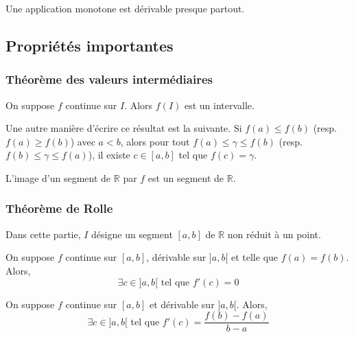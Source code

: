 	\begin{theorem}[Lebesgue]
		Une application monotone est dérivable presque partout.
	\end{theorem}

	\newpage
	\subsection{Propriétés importantes}

	\subsubsection{Théorème des valeurs intermédiaires}


	\begin{theorem}
		On suppose $f$ continue sur $I$. Alors $f(I)$ est un intervalle.
	\end{theorem}

	\begin{remark}
		Une autre manière d'écrire ce résultat est la suivante. Si $f(a) \leq f(b)$ (resp. $f(a) \geq f(b)$) avec $a < b$, alors pour tout $f(a) \leq \gamma \leq f(b)$ (resp. $f(b) \leq \gamma \leq f(a)$), il existe $c \in [a,b]$ tel que $f(c) = \gamma$.
	\end{remark}

	\begin{corollary}
		L'image d'un segment de $\mathbb{R}$ par $f$ est un segment de $\mathbb{R}$.
	\end{corollary}

	\subsubsection{Théorème de Rolle}

	Dans cette partie, $I$ désigne un segment $[a,b]$ de $\mathbb{R}$ non réduit à un point.

	\begin{theorem}[Rolle]
		On suppose $f$ continue sur $[a,b]$, dérivable sur $]a,b[$ et telle que $f(a) = f(b)$. Alors,
		\[ \exists c \in ]a,b[ \text{ tel que } f'(c) = 0 \]
	\end{theorem}

	\begin{theorem}
		On suppose $f$ continue sur $[a,b]$ et dérivable sur $]a,b[$. Alors,
		\[ \exists c \in ]a,b[ \text{ tel que } f'(c) = \frac{f(b) - f(a)}{b-a} \]
	\end{theorem}

